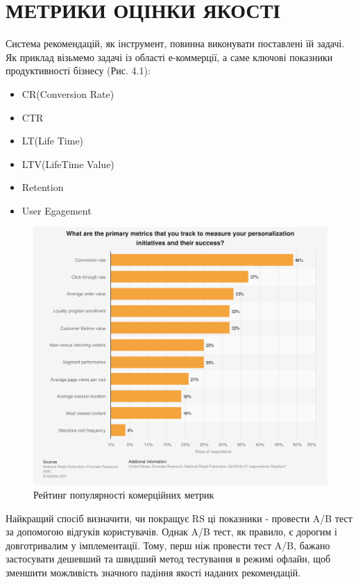 \section{МЕТРИКИ ОЦІНКИ ЯКОСТІ}

Система рекомендацій, як інструмент, повинна виконувати поставлені
їй задачі. Як приклад візьмемо задачі із області е-коммерції, а
саме ключові показники продуктивності бізнесу (Рис. 4.1):
\begin{itemize}
    \item CR(Conversion Rate)
    \item CTR
    \item LT(Life Time)
    \item LTV(LifeTime Value)
    \item Retention
    \item User Egagement
\end{itemize}
\begin{figure}[h]
    \includegraphics[width=1\textwidth]{images/E_commerce_metrics.png}
    \caption{Рейтинг популярності комерційних метрик}
    \label{fig:ecommerce_pop_metric}
\end{figure}

Найкращий спосіб визначити, чи покращує RS ці показники - провести A/B тест за допомогою відгуків користувачів.
Однак A/B тест, як правило, є дорогим і довготривалим у імплементації. Тому, перш ніж провести тест A/B, бажано
застосувати дешевший та швидший метод тестування в режимі офлайн,
щоб зменшити можливість значного падіння якості наданих рекомендацій.

